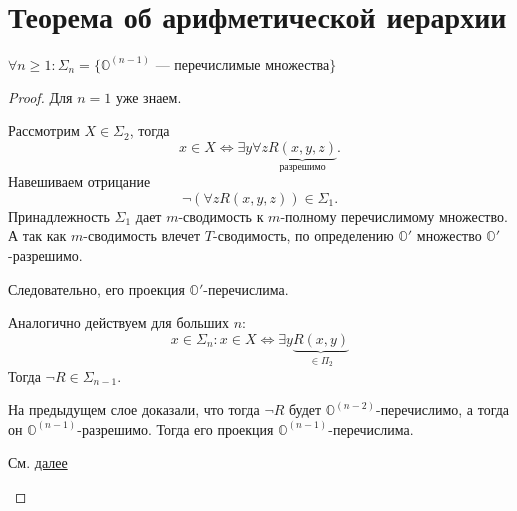 \section{Теорема об арифметической иерархии}

\begin{thm}
	$  \forall n \ge 1 \colon \Sigma _n = \{\mathbb{O}^{(n-1)} \text{ --- перечислимые множества}\}$
\end{thm}
\begin{proof}
    Для $ n = 1$ уже знаем.
	\begin{description}
	    \item \boxed{  \subset } 
			Рассмотрим $ X \in \Sigma _2$, тогда
			\[
				x \in X \Longleftrightarrow \exists y \forall z \underbrace{R(x, y,z)}_{ \text{разрешимо}}
			.\] 
			Навешиваем отрицание
			\[
				\neg \left( \forall z R(x, y, z) \right)  \in \Sigma _1
			.\] 
			Принадлежность $  \Sigma _1$ дает $ m$-сводимость к $ m$-полному перечислимому множество. А так как $ m$-сводимость влечет $ T$-сводимость, по определению $ \mathbb{O}'$ множество  $ \mathbb{O}'$-разрешимо.

			Следовательно, его проекция $ \mathbb{O}'$-перечислима.

			Аналогично действуем для больших  $ n$: 
			\[ x \in \Sigma_n\colon x \in X \Longleftrightarrow \exists y \underbrace{R(x, y)}_{ \in \Pi _2}\]
			Тогда $ \neg R \in \Sigma _{n-1} .$ 

		На предыдущем слое доказали, что тогда $ \neg R $ будет $ \mathbb{O}^{(n-2)}$-перечислимо, а тогда он $ \mathbb{O}^{(n-1)}$-разрешимо. Тогда его проекция $ \mathbb{O}^{(n-1)}$-перечислима.
	    \item \boxed{\supset } 
			См. \hyperref[proof:main_thm]{далее}
	\end{description} 
\end{proof}


